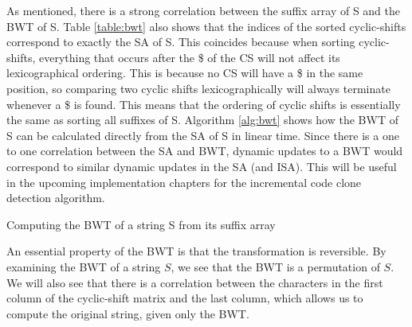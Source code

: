 As mentioned, there is a strong correlation between the suffix array of S and the BWT of
S. Table \ref{table:bwt} also shows that the indices of the sorted cyclic-shifts
correspond to exactly the SA of S. This coincides because when sorting cyclic-shifts,
everything that occurs after the \$ of the CS will not affect its lexicographical
ordering. This is because no CS will have a \$ in the same position, so comparing two
cyclic shifts lexicographically will always terminate whenever a \$ is found. This means
that the ordering of cyclic shifts is essentially the same as sorting all suffixes of S.
Algorithm \ref{alg:bwt} shows how the BWT of S can be calculated directly from the SA of S
in linear time. Since there is a one to one correlation between the SA and BWT, dynamic
updates to a BWT would correspond to similar dynamic updates in the SA (and ISA). This
will be useful in the upcoming implementation chapters for the incremental code clone
detection algorithm.

\begin{algorithm}[t]
  \SetAlgoLined\DontPrintSemicolon

  \vspace{0.5cm}
  \caption{Computing the BWT of a string S from its suffix array}
  \label{alg:bwt}
\end{algorithm}


An essential property of the BWT is that the transformation is reversible. By examining
the BWT of a string $S$, we see that the BWT is a permutation of $S$. We will also see
that there is a correlation between the characters in the first column of the cyclic-shift
matrix and the last column, which allows us to compute the original string, given only the
BWT.

